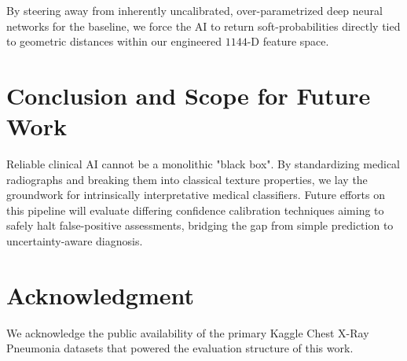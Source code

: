 \documentclass[conference]{IEEEtran}
\begin{document}
By steering away from inherently uncalibrated, over-parametrized deep neural networks for the baseline, we force the AI to return soft-probabilities directly tied to geometric distances within our engineered $1144$-D feature space.

\section{Conclusion and Scope for Future Work}
Reliable clinical AI cannot be a monolithic "black box". By standardizing medical radiographs and breaking them into classical texture properties, we lay the groundwork for intrinsically interpretative medical classifiers. Future efforts on this pipeline will evaluate differing confidence calibration techniques aiming to safely halt false-positive assessments, bridging the gap from simple prediction to uncertainty-aware diagnosis.

\section*{Acknowledgment}

We acknowledge the public availability of the primary Kaggle Chest X-Ray Pneumonia datasets that powered the evaluation structure of this work.



\end{document}

